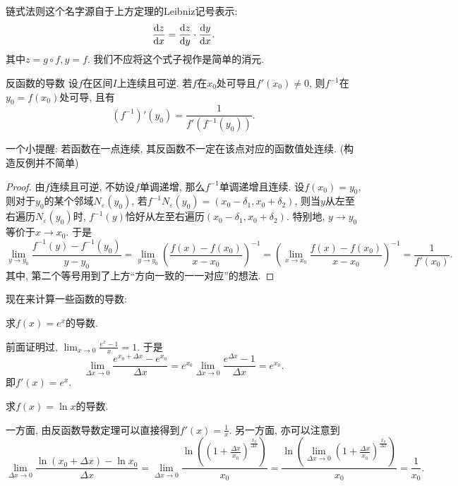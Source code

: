 链式法则这个名字源自于上方定理的Leibniz记号表示: $$\frac{\mathop{}\!\mathrm{d} z}{\mathop{}\!\mathrm{d} x} = \frac{\mathop{}\!\mathrm{d} z}{\mathop{}\!\mathrm{d} y} \cdot \frac{\mathop{}\!\mathrm{d} y}{\mathop{}\!\mathrm{d} x}. $$
其中$z=g \circ f, y=f$. 我们不应将这个式子视作是简单的消元. 

\begin{theorem}{反函数的导数} \label{thm:fjhjuudedcuu}
	设$f$在区间$I$上连续且可逆. 若$f$在$x_0$处可导且$f'(x_0) \neq 0$, 则$f^{-1}$在$y_0=f(x_0)$处可导, 且有$$(f^{-1})'(y_0)=\frac{1}{f'(f^{-1}(y_0))}. $$
\end{theorem}
\begin{remark}
	一个小提醒: 若函数在一点连续, 其反函数不一定在该点对应的函数值处连续. (构造反例并不简单)
\end{remark}
\begin{proof}
	由$f$连续且可逆, 不妨设$f$单调递增, 那么$f^{-1}$单调递增且连续. 设$f(x_0)=y_0$, 则对于$y_0$的某个邻域$N_{\varepsilon}(y_0)$, 若$f^{-1}N_{\varepsilon}(y_0) = (x_0-\delta _1,x_0+\delta _2)$, 则当$y$从左至右遍历$N_{\varepsilon}(y_0)$时, $f^{-1}(y)$恰好从左至右遍历$(x_0-\delta _1,x_0+\delta _2)$. 特别地, $y \to y_0$等价于$x \to x_0$. 于是$$\lim_{y \to y_0} \frac{f^{-1}(y)-f^{-1}(y_0)}{y-y_0} = \lim_{y \to y_0} \left( \frac{f(x)-f(x_0)}{x-x_0} \right)^{-1} = \left( \lim_{x \to x_0}  \frac{f(x)-f(x_0)}{x-x_0} \right)^{-1} = \frac{1}{f'(x_0)}. $$
	其中, 第二个等号用到了上方“方向一致的一一对应”的想法. 
\end{proof}

现在来计算一些函数的导数: 

\begin{example}
	求$f(x)=e^x$的导数. 
\end{example}
\begin{solution}
	前面证明过, $\lim_{x \to 0} \frac{e^x-1}{x} = 1$. 于是$$\lim_{\Delta x \to 0} \frac{e^{x_0+\Delta x} - e^{x_0}}{\Delta x} = e^{x_0} \lim_{\Delta x \to 0} \frac{e^{\Delta x}-1}{\Delta x} = e^{x_0}. $$
	即$f'(x)=e^x$. 
\end{solution}

\begin{example}
	求$f(x) = \ln x$的导数. 
\end{example}
\begin{solution}
	一方面, 由反函数导数定理可以直接得到$f'(x)=\frac{1}{x}$. 另一方面, 亦可以注意到$$\lim_{\Delta x \to 0} \frac{\ln (x_0+\Delta x) - \ln x_0}{\Delta x} = \lim_{\Delta x \to 0} \frac{\ln \left( (1+\frac{\Delta x}{x_0})^{\frac{x_0}{\Delta x}} \right)}{x_0} = \frac{\ln \left(\lim_{\Delta x \to 0}  (1+\frac{\Delta x}{x_0})^{\frac{x_0}{\Delta x}} \right)}{x_0} = \frac{1}{x_0}. $$
\end{solution}


